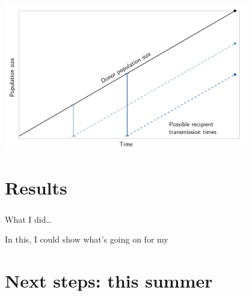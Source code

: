 \documentclass[aspectratio=169]{beamer}
\begin{document}
\begin{frame} \frametitle{\insertsection}

    \centering\includegraphics[width=0.8\textwidth]{images/linear-time-location}

\end{frame}

\section{Results}

\begin{frame} \frametitle{\insertsection}

    What I did\ldots

    In this, I could show what's going on for my 

\end{frame}

\section{Next steps: this summer}
\end{document}
